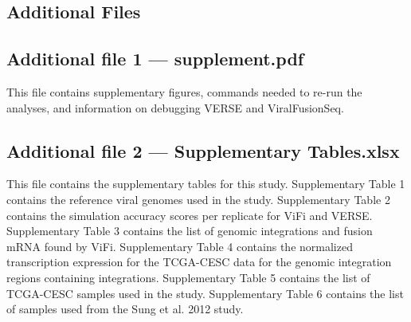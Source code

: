 \documentclass{bmcart}
\begin{document}
\begin{backmatter}

\section*{Additional Files}
  \subsection*{\textbf{Additional file 1} --- supplement.pdf}
    This file contains supplementary figures, commands needed to re-run the analyses, and information on 
    debugging VERSE and ViralFusionSeq.
    
  \subsection*{\textbf{Additional file 2} --- Supplementary Tables.xlsx}
    This file contains the supplementary tables for this study.  Supplementary Table 1 contains the reference viral genomes used in the study.  Supplementary Table 2 contains the simulation accuracy scores per replicate for ViFi and VERSE.  Supplementary Table 3 contains the list of genomic integrations and fusion mRNA found by ViFi.  Supplementary Table 4 contains the normalized transcription expression for the TCGA-CESC data for the genomic integration regions containing integrations.  Supplementary Table 5 contains the list of TCGA-CESC samples used in the study.  Supplementary Table 6 contains the list of samples used from the Sung et al. 2012 study.


\end{backmatter}
\end{document}
